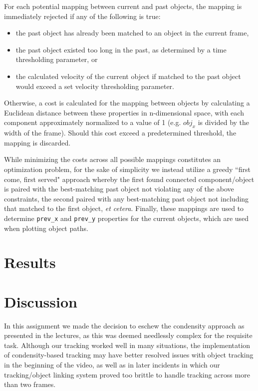 \documentclass[12pt,a4paper]{article}
\begin{document}
For each potential mapping between current and past objects, the mapping is immediately rejected if any of the following is true:
\begin{itemize}
\item the past object has already been matched to an object in the current frame,
\item the past object existed too long in the past, as determined by a time thresholding parameter, or
\item the calculated velocity of the current object if matched to the past object would exceed a set velocity thresholding parameter.
\end{itemize}
Otherwise, a cost is calculated for the mapping between objects by calculating a Euclidean distance between these properties in n-dimensional space, with each component approximately normalized to a value of 1 (e.g. $obj_{x}$ is divided by the width of the frame). Should this cost exceed a predetermined threshold, the mapping is discarded.

While minimizing the costs across all possible mappings constitutes an optimization problem, for the sake of simplicity we instead utilize a greedy ``first come, first served" approach whereby the first found connected component/object is paired with the best-matching past object not violating any of the above constraints, the second paired with any best-matching past object not including that matched to the first object, \textit{et cetera}. Finally, these mappings are used to determine \texttt{prev\_x} and \texttt{prev\_y} properties for the current objects, which are used when plotting object paths.

\section{Results}

\section{Discussion}
In this assignment we made the decision to eschew the condensity approach as presented in the lectures, as this was deemed needlessly complex for the requisite task. Although our tracking worked well in many situations, the implementation of condensity-based tracking may have better resolved issues with object tracking in the beginning of the video, as well as in later incidents in which our tracking/object linking system proved too brittle to handle tracking across more than two frames.
\end{document}
